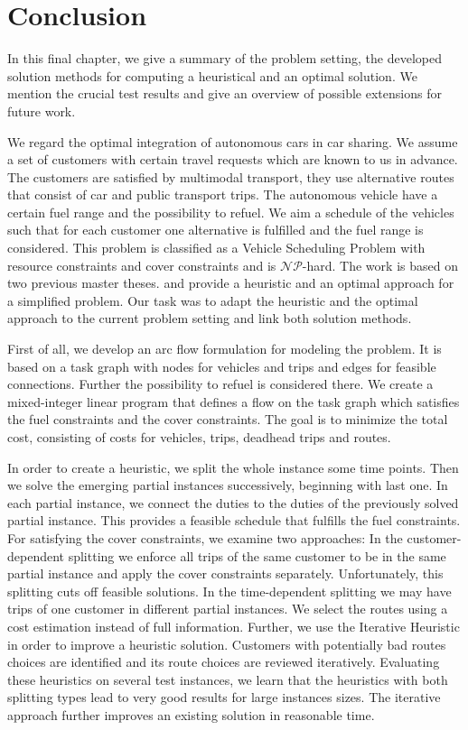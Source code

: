 \chapter{Conclusion}
\label{ch:conclusion}

In this final chapter, we give a summary of the problem setting, the developed solution methods for computing a heuristical and an optimal solution. We mention the crucial test results and give an overview of possible extensions for future work.

We regard the optimal integration of autonomous cars in car sharing. We assume a set of customers with certain travel requests which are known to us in advance. The customers are satisfied by multimodal transport, \ie they use alternative routes that consist of car and public transport trips. The autonomous vehicle have a certain fuel range and the possibility to refuel. We aim a schedule of the vehicles such that for each customer one alternative is fulfilled and the fuel range is considered. This problem is classified as a Vehicle Scheduling Problem with resource constraints and cover constraints and is $\mathcal{NP}$-hard. The work is based on two previous master theses. \cite{Knoll} and \cite{Kaiser} provide a heuristic and an optimal approach for a simplified problem. Our task was to adapt the heuristic and the optimal approach to the current problem setting and link both solution methods.

First of all, we develop an arc flow formulation for modeling the problem. It is based on a task graph with nodes for vehicles and trips and edges for feasible connections. Further the possibility to refuel is considered there. We create a mixed-integer linear program that defines a flow on the task graph which satisfies the fuel constraints and the cover constraints. The goal is to minimize the total cost, consisting of costs for vehicles, trips, deadhead trips and routes.

In order to create a heuristic, we split the whole instance \wrt some time points. Then we solve the emerging partial instances successively, beginning with last one. In each partial instance, we connect the duties to the duties of the previously solved partial instance. This provides a feasible schedule that fulfills the fuel constraints. For satisfying the cover constraints, we examine two approaches: In the customer-dependent splitting we enforce all trips of the same customer to be in the same partial instance and apply the cover constraints separately. Unfortunately, this splitting cuts off feasible solutions. In the time-dependent splitting we may have trips of one customer in different partial instances. We select the routes using a cost estimation instead of full information. Further, we use the Iterative Heuristic in order to improve a heuristic solution. Customers with potentially bad routes choices are identified and its route choices are reviewed iteratively. Evaluating these heuristics on several test instances, we learn that the heuristics with both splitting types lead to very good results for large instances sizes. The iterative approach further improves an existing solution in reasonable time.

